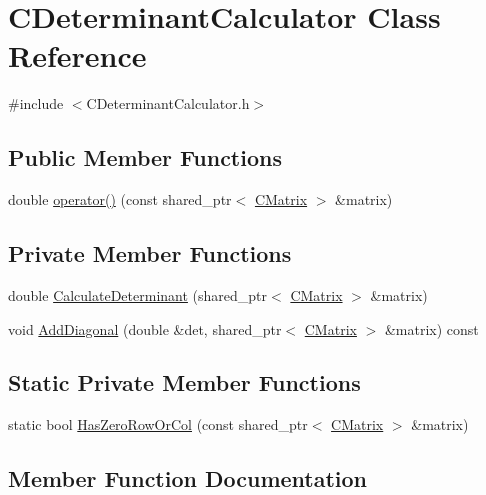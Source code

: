 \hypertarget{classCDeterminantCalculator}{}\section{C\+Determinant\+Calculator Class Reference}
\label{classCDeterminantCalculator}


{\ttfamily \#include $<$C\+Determinant\+Calculator.\+h$>$}

\subsection*{Public Member Functions}
\begin{DoxyCompactItemize}
\item 
double \hyperlink{classCDeterminantCalculator_a1f86ba4955b9cabf3042b96be7563a10}{operator()} (const shared\+\_\+ptr$<$ \hyperlink{classCMatrix}{C\+Matrix} $>$ \&matrix)
\end{DoxyCompactItemize}
\subsection*{Private Member Functions}
\begin{DoxyCompactItemize}
\item 
double \hyperlink{classCDeterminantCalculator_a1b56e8907eb6d7bbc9083d7f10118186}{Calculate\+Determinant} (shared\+\_\+ptr$<$ \hyperlink{classCMatrix}{C\+Matrix} $>$ \&matrix)
\item 
void \hyperlink{classCDeterminantCalculator_a9da30150339c152a64e7e43b10d98d08}{Add\+Diagonal} (double \&det, shared\+\_\+ptr$<$ \hyperlink{classCMatrix}{C\+Matrix} $>$ \&matrix) const 
\end{DoxyCompactItemize}
\subsection*{Static Private Member Functions}
\begin{DoxyCompactItemize}
\item 
static bool \hyperlink{classCDeterminantCalculator_af95c02164648b7a50ed4ec7ccf370617}{Has\+Zero\+Row\+Or\+Col} (const shared\+\_\+ptr$<$ \hyperlink{classCMatrix}{C\+Matrix} $>$ \&matrix)
\end{DoxyCompactItemize}


\subsection{Member Function Documentation}
